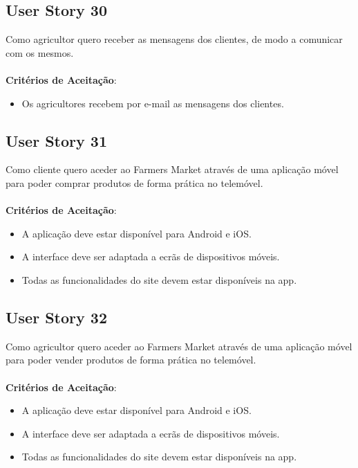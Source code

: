 \documentclass[a4paper,11pt]{article}
\begin{document}
\subsection{User Story 30}
Como agricultor quero receber as mensagens dos clientes, de modo a comunicar com os mesmos.\\\\
\textbf{Critérios de Aceitação}:
\begin{itemize}
  \item Os agricultores recebem por e-mail as mensagens dos clientes.
\end{itemize}
\subsection{User Story 31}
Como cliente quero aceder ao Farmers Market através de uma aplicação móvel para poder comprar produtos de forma prática no telemóvel.\\\\
\textbf{Critérios de Aceitação}:
\begin{itemize}
  \item A aplicação deve estar disponível para Android e iOS.
  \item A interface deve ser adaptada a ecrãs de dispositivos móveis.
  \item Todas as funcionalidades do site devem estar disponíveis na app.
\end{itemize}
\subsection{User Story 32}
Como agricultor quero aceder ao Farmers Market através de uma aplicação móvel para poder vender produtos de forma prática no telemóvel.\\\\
\textbf{Critérios de Aceitação}:
\begin{itemize}
  \item A aplicação deve estar disponível para Android e iOS.
  \item A interface deve ser adaptada a ecrãs de dispositivos móveis.
  \item Todas as funcionalidades do site devem estar disponíveis na app.
\end{itemize}
\vspace{67pt}
\end{document}
